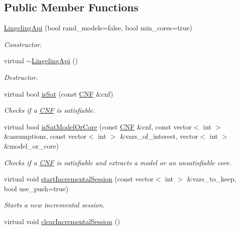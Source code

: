 \subsection*{Public Member Functions}
\begin{DoxyCompactItemize}
\item 
\hyperlink{classLingelingApi_a9a66bc58b8bbe631c82d3c80173c947f}{Lingeling\-Api} (bool rand\-\_\-models=false, bool min\-\_\-cores=true)
\begin{DoxyCompactList}\small\item\em Constructor. \end{DoxyCompactList}\item 
virtual \hyperlink{classLingelingApi_aae29bce532ab33b867d5cc4c96f80cd2}{$\sim$\-Lingeling\-Api} ()
\begin{DoxyCompactList}\small\item\em Destructor. \end{DoxyCompactList}\item 
virtual bool \hyperlink{classLingelingApi_a38358f64ded244e2e3d843d0565f0177}{is\-Sat} (const \hyperlink{classCNF}{C\-N\-F} \&cnf)
\begin{DoxyCompactList}\small\item\em Checks if a \hyperlink{classCNF}{C\-N\-F} is satisfiable. \end{DoxyCompactList}\item 
virtual bool \hyperlink{classLingelingApi_a8f147b59f0ebabc35a20d295f28d499f}{is\-Sat\-Model\-Or\-Core} (const \hyperlink{classCNF}{C\-N\-F} \&cnf, const vector$<$ int $>$ \&assumptions, const vector$<$ int $>$ \&vars\-\_\-of\-\_\-interest, vector$<$ int $>$ \&model\-\_\-or\-\_\-core)
\begin{DoxyCompactList}\small\item\em Checks if a \hyperlink{classCNF}{C\-N\-F} is satisfiable and extracts a model or an unsatisfiable core. \end{DoxyCompactList}\item 
virtual void \hyperlink{classLingelingApi_a844da6cbdf38b7cc8abd0b1710350be2}{start\-Incremental\-Session} (const vector$<$ int $>$ \&vars\-\_\-to\-\_\-keep, bool use\-\_\-push=true)
\begin{DoxyCompactList}\small\item\em Starts a new incremental session. \end{DoxyCompactList}\item 
virtual void \hyperlink{classLingelingApi_a4200b2ca7b1694898434ae9764f5baf6}{clear\-Incremental\-Session} ()

\end{DoxyCompactItemize}
